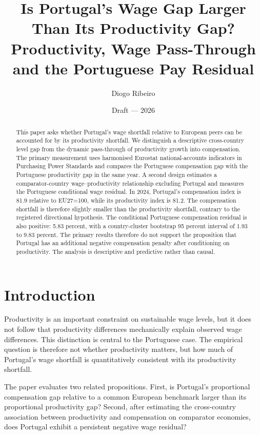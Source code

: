 \documentclass[11pt,a4paper]{article}
\title{Is Portugal's Wage Gap Larger Than Its Productivity Gap?\\
\large Productivity, Wage Pass-Through and the Portuguese Pay Residual}
\author{Diogo Ribeiro}
\date{Draft --- 2026}
\begin{document}
\maketitle

\begin{abstract}
This paper asks whether Portugal's wage shortfall relative to European peers can be accounted for by its productivity shortfall. We distinguish a descriptive cross-country level gap from the dynamic pass-through of productivity growth into compensation. The primary measurement uses harmonised Eurostat national-accounts indicators in Purchasing Power Standards and compares the Portuguese compensation gap with the Portuguese productivity gap in the same year. A second design estimates a comparator-country wage--productivity relationship excluding Portugal and measures the Portuguese conditional wage residual. In 2024, Portugal's compensation index is 81.9 relative to EU27=100, while its productivity index is 81.2. The compensation shortfall is therefore slightly smaller than the productivity shortfall, contrary to the registered directional hypothesis. The conditional Portuguese compensation residual is also positive: 5.83 percent, with a country-cluster bootstrap 95 percent interval of 1.93 to 9.83 percent. The primary results therefore do not support the proposition that Portugal has an additional negative compensation penalty after conditioning on productivity. The analysis is descriptive and predictive rather than causal.
\end{abstract}

\section{Introduction}
Productivity is an important constraint on sustainable wage levels, but it does not follow that productivity differences mechanically explain observed wage differences. This distinction is central to the Portuguese case. The empirical question is therefore not whether productivity matters, but how much of Portugal's wage shortfall is quantitatively consistent with its productivity shortfall.

The paper evaluates two related propositions. First, is Portugal's proportional compensation gap relative to a common European benchmark larger than its proportional productivity gap? Second, after estimating the cross-country association between productivity and compensation on comparator economies, does Portugal exhibit a persistent negative wage residual?
\end{document}
